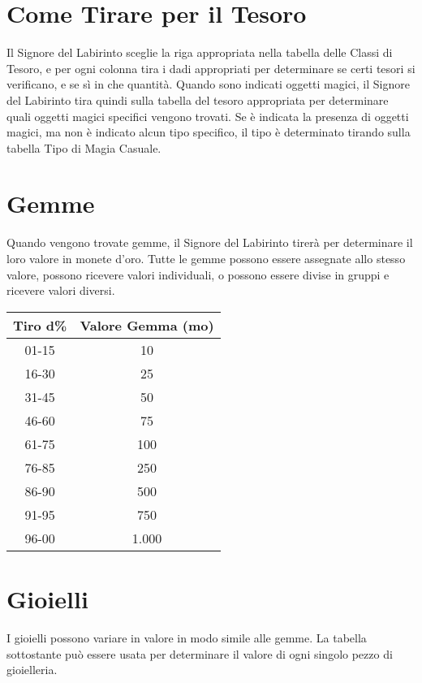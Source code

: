 \documentclass{article}
\begin{document}
\begin{multicols}{2}

\section{Come Tirare per il Tesoro}

Il Signore del Labirinto sceglie la riga appropriata nella tabella delle Classi di Tesoro, e per ogni colonna tira i dadi appropriati per determinare se certi tesori si verificano, e se sì in che quantità. Quando sono indicati oggetti magici, il Signore del Labirinto tira quindi sulla tabella del tesoro appropriata per determinare quali oggetti magici specifici vengono trovati. Se è indicata la presenza di oggetti magici, ma non è indicato alcun tipo specifico, il tipo è determinato tirando sulla tabella Tipo di Magia Casuale.

\section{Gemme}

Quando vengono trovate gemme, il Signore del Labirinto tirerà per determinare il loro valore in monete d'oro. Tutte le gemme possono essere assegnate allo stesso valore, possono ricevere valori individuali, o possono essere divise in gruppi e ricevere valori diversi.

\begin{tabular}{|c|c|}
\hline
\textbf{Tiro d\%} & \textbf{Valore Gemma (mo)} \\
\hline
01-15 & 10 \\
16-30 & 25 \\
31-45 & 50 \\
46-60 & 75 \\
61-75 & 100 \\
76-85 & 250 \\
86-90 & 500 \\
91-95 & 750 \\
96-00 & 1.000 \\
\hline
\end{tabular}

\section{Gioielli}

I gioielli possono variare in valore in modo simile alle gemme. La tabella sottostante può essere usata per determinare il valore di ogni singolo pezzo di gioielleria.


\end{multicols}
\end{document}
